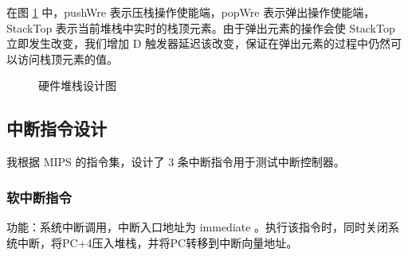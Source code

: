 \documentclass{article}
\begin{document}
在图 \ref{M4} 中，pushWre 表示压栈操作使能端，popWre 表示弹出操作使能端，StackTop 表示当前堆栈中实时的栈顶元素。由于弹出元素的操作会使 StackTop 立即发生改变，我们增加 D 触发器延迟该改变，保证在弹出元素的过程中仍然可以访问栈顶元素的值。


\def\Stack(#1)#2{
	\begin{scope}[shift={(#1)}]
		\draw (0,0) rectangle(5,2);
		\draw (2.5,2) -- (2.5,0);
		\node at (3.75,1.0) {StackTop};
		\draw (5,1.0) -- +(0.25,0) coordinate (#2 StackTop);
		\draw (0,1.75) node[right] {clk} -- + (-0.25,0) coordinate (#2 clk);
		\draw (0,1.25) node[right] {pushWre} -- + (-0.25,0) coordinate (#2 pushWre);
		\draw (0,0.75) node[right] {popWre} -- + (-0.25,0) coordinate (#2 popWre);
		\draw (0,0.25) node[right] {dataIn} -- + (-0.25,0) coordinate (#2 dataIn);
	\end{scope}
}

\def\DTrigger(#1)#2{
	\begin{scope}[shift={(#1)}]
		\draw (0,0) rectangle(2,1);
		\draw (1,1) -- (1,0);
		\node at (1.5,0.5) {Q};
		\draw (2,0.5) -- + (0.25,0) coordinate (#2 Q);
		\draw (0,0.75) node[right] {clk} -- + (-0.25,0) coordinate (#2 clk);
		\draw (0,0.25) node[right] {D} -- + (-0.25,0) coordinate (#2 D);
	\end{scope}
}

\begin{figure}
\centering

\caption{硬件堆栈设计图}
\label{M4}
\end{figure}

\subsection{中断指令设计}

我根据 MIPS 的指令集，设计了 3 条中断指令用于测试中断控制器。

\subsubsection{软中断指令}

功能：系统中断调用，中断入口地址为 immediate 。执行该指令时，同时关闭系统中断，将PC+4压入堆栈，并将PC转移到中断向量地址。
\end{document}
